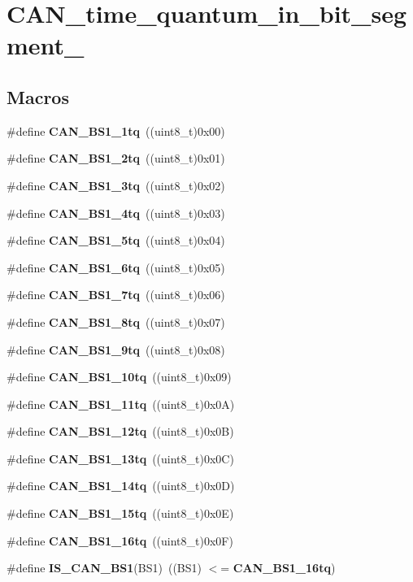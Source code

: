 \section{C\+A\+N\+\_\+time\+\_\+quantum\+\_\+in\+\_\+bit\+\_\+segment\+\_}
\label{group__CAN__time__quantum__in__bit__segment__1}
\subsection*{Macros}
\begin{DoxyCompactItemize}
\item 
\#define \textbf{ C\+A\+N\+\_\+\+B\+S1\+\_\+1tq}~((uint8\+\_\+t)0x00)
\item 
\#define \textbf{ C\+A\+N\+\_\+\+B\+S1\+\_\+2tq}~((uint8\+\_\+t)0x01)
\item 
\#define \textbf{ C\+A\+N\+\_\+\+B\+S1\+\_\+3tq}~((uint8\+\_\+t)0x02)
\item 
\#define \textbf{ C\+A\+N\+\_\+\+B\+S1\+\_\+4tq}~((uint8\+\_\+t)0x03)
\item 
\#define \textbf{ C\+A\+N\+\_\+\+B\+S1\+\_\+5tq}~((uint8\+\_\+t)0x04)
\item 
\#define \textbf{ C\+A\+N\+\_\+\+B\+S1\+\_\+6tq}~((uint8\+\_\+t)0x05)
\item 
\#define \textbf{ C\+A\+N\+\_\+\+B\+S1\+\_\+7tq}~((uint8\+\_\+t)0x06)
\item 
\#define \textbf{ C\+A\+N\+\_\+\+B\+S1\+\_\+8tq}~((uint8\+\_\+t)0x07)
\item 
\#define \textbf{ C\+A\+N\+\_\+\+B\+S1\+\_\+9tq}~((uint8\+\_\+t)0x08)
\item 
\#define \textbf{ C\+A\+N\+\_\+\+B\+S1\+\_\+10tq}~((uint8\+\_\+t)0x09)
\item 
\#define \textbf{ C\+A\+N\+\_\+\+B\+S1\+\_\+11tq}~((uint8\+\_\+t)0x0\+A)
\item 
\#define \textbf{ C\+A\+N\+\_\+\+B\+S1\+\_\+12tq}~((uint8\+\_\+t)0x0\+B)
\item 
\#define \textbf{ C\+A\+N\+\_\+\+B\+S1\+\_\+13tq}~((uint8\+\_\+t)0x0\+C)
\item 
\#define \textbf{ C\+A\+N\+\_\+\+B\+S1\+\_\+14tq}~((uint8\+\_\+t)0x0\+D)
\item 
\#define \textbf{ C\+A\+N\+\_\+\+B\+S1\+\_\+15tq}~((uint8\+\_\+t)0x0\+E)
\item 
\#define \textbf{ C\+A\+N\+\_\+\+B\+S1\+\_\+16tq}~((uint8\+\_\+t)0x0\+F)
\item 
\#define \textbf{ I\+S\+\_\+\+C\+A\+N\+\_\+\+B\+S1}(B\+S1)~((B\+S1) $<$= \textbf{ C\+A\+N\+\_\+\+B\+S1\+\_\+16tq})
\end{DoxyCompactItemize}


